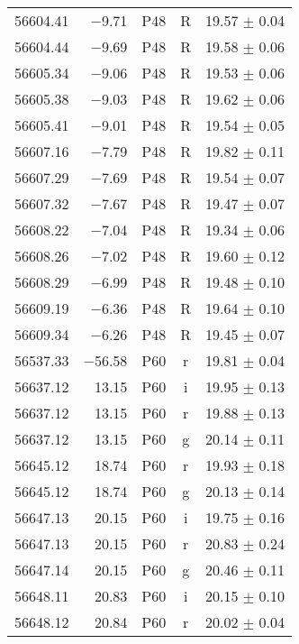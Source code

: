 \begin{tabular}{crccc}
    56604.41  & $-$9.71  &       P48  &   R  &     19.57 $\pm$ 0.04 \\
    56604.44  & $-$9.69  &       P48  &   R  &     19.58 $\pm$ 0.06 \\
    56605.34  & $-$9.06  &       P48  &   R  &     19.53 $\pm$ 0.06 \\
    56605.38  & $-$9.03  &       P48  &   R  &     19.62 $\pm$ 0.06 \\
    56605.41  & $-$9.01  &       P48  &   R  &     19.54 $\pm$ 0.05 \\
    56607.16  & $-$7.79  &       P48  &   R  &     19.82 $\pm$ 0.11 \\
    56607.29  & $-$7.69  &       P48  &   R  &     19.54 $\pm$ 0.07 \\
    56607.32  & $-$7.67  &       P48  &   R  &     19.47 $\pm$ 0.07 \\
    56608.22  & $-$7.04  &       P48  &   R  &     19.34 $\pm$ 0.06 \\
    56608.26  & $-$7.02  &       P48  &   R  &     19.60 $\pm$ 0.12 \\
    56608.29  & $-$6.99  &       P48  &   R  &     19.48 $\pm$ 0.10 \\
    56609.19  & $-$6.36  &       P48  &   R  &     19.64 $\pm$ 0.10 \\
    56609.34  & $-$6.26  &       P48  &   R  &     19.45 $\pm$ 0.07 \\
    56537.33  &$-$56.58  &       P60  &   r  &     19.81 $\pm$ 0.04 \\
    56637.12  &   13.15  &       P60  &   i  &     19.95 $\pm$ 0.13 \\
    56637.12  &   13.15  &       P60  &   r  &     19.88 $\pm$ 0.13 \\
    56637.12  &   13.15  &       P60  &   g  &     20.14 $\pm$ 0.11 \\
    56645.12  &   18.74  &       P60  &   r  &     19.93 $\pm$ 0.18 \\
    56645.12  &   18.74  &       P60  &   g  &     20.13 $\pm$ 0.14 \\
    56647.13  &   20.15  &       P60  &   i  &     19.75 $\pm$ 0.16 \\
    56647.13  &   20.15  &       P60  &   r  &     20.83 $\pm$ 0.24 \\
    56647.14  &   20.15  &       P60  &   g  &     20.46 $\pm$ 0.11 \\
    56648.11  &   20.83  &       P60  &   i  &     20.15 $\pm$ 0.10 \\
    56648.12  &   20.84  &       P60  &   r  &     20.02 $\pm$ 0.04 \\

\end{tabular}

